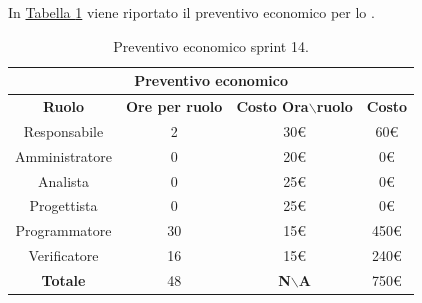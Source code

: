 In \hyperref[tab:sprint14_preventivo_economico]{Tabella \ref{tab:sprint14_preventivo_economico}} viene riportato il preventivo economico per lo .
\begin{table}[H]
    \centering
    \begin{tabular}{|c|c|c|c|}
        \hline
            \multicolumn{4}{|c|}{\textbf{Preventivo economico}} \\ 
        \hline
            \textbf{Ruolo} & \textbf{Ore per ruolo} & \textbf{Costo Ora$\backslash$ruolo} & \textbf{Costo} \\
        \hline
        Responsabile & 2 & 30€ & 60€ \\
        \hline
        Amministratore & 0 & 20€ & 0€ \\
        \hline
        Analista & 0 & 25€ & 0€ \\
        \hline
        Progettista & 0 & 25€ & 0€ \\
        \hline
        Programmatore & 30 & 15€ & 450€ \\
        \hline
        Verificatore & 16 & 15€ & 240€ \\
        \hline 
        \textbf{Totale} & 48 & \textbf{N$\backslash$A} & 750€  \\
        \hline
    \end{tabular}
    \caption{Preventivo economico sprint 14.}
    \label{tab:sprint14_preventivo_economico}
\end{table}
